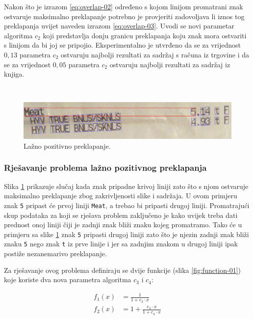 \documentclass[times, utf8, zavrsni]{fer}
\begin{document}
Nakon što je izrazom \ref{eq:overlap-02} određeno s kojom linijom promatrani
znak ostvaruje maksimalno preklapanje potrebno je provjeriti zadovoljava li
iznos tog preklapanja uvijet naveden izrazom \ref{eq:overlap-03}. Uvodi se novi
parametar algoritma $c_2$ koji predstavlja donju granicu preklapanja koju znak
mora ostvariti s linijom da bi joj se pripojio. Eksperimentalno je utvrđeno da
se za vrijednost $0{,}13$ parametra $c_2$ ostvaruju najbolji rezultati za
sadržaj s računa iz trgovine i da se za vrijednost $0{,}05$ parametra $c_2$
ostvaruju najbolji rezultati za sadržaj iz knjiga.

\

\begin{figure}[htb]
    \centering
    \captionsetup{justification=centering,margin=2cm}
    \includegraphics[width=\textwidth]{images/overlap-02.png}
    \caption{Lažno pozitivno preklapanje.}
    \label{fig:overlap-02}
\end{figure}


\subsubsection{Rješavanje problema lažno pozitivnog preklapanja}
Slika \ref{fig:overlap-02} prikazuje slučaj kada znak pripadne krivoj liniji
zato što s njom ostvaruje maksimalno preklapanje zbog zakrivljenosti slike i
sadržaja. U ovom primjeru znak \lstinline{5} pripast će prvoj liniji
\lstinline{Meat}, a trebao bi pripasti drugoj liniji. Promatrajući skup
podataka za koji se rješava problem zaključeno je kako uvijek treba dati
prednost onoj liniji čiji je zadnji znak bliži znaku kojeg promatramo. Tako će
u primjeru sa slike \ref{fig:overlap-02} znak \lstinline{5} pripasti drugoj
liniji zato što je njezin zadnji znak bliži znaku \lstinline{5} nego znak
\lstinline{t} iz prve linije i jer sa zadnjim znakom u drugoj liniji ipak
postiže nezanemarivo preklapanje.

Za rješavanje ovog problema definiraju se dvije funkcije (slika
\ref{fig:function-01})
koje koriste dva nova parametra algoritma $c_3$ i $c_4$:

\begin{align}
f_1(x) &= \frac{1}{1 + c_3 \cdot x} \\[10pt]
f_2(x) &= 1 + \frac{c_4 \cdot x}{1 + c_4 \cdot x}
\end{align}
\end{document}
